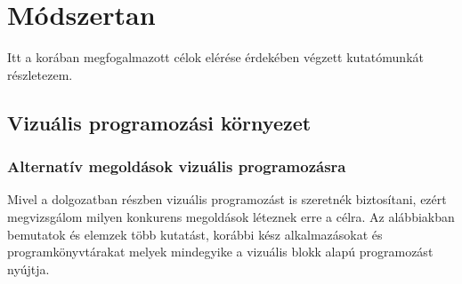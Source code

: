 \documentclass[12pt,a4paper,oneside]{report} %
\begin{document}

\chapter{Módszertan}
\label{modtan}
Itt a korában megfogalmazott célok elérése érdekében végzett kutatómunkát részletezem.
\section{Vizuális programozási környezet}
\subsection{Alternatív megoldások vizuális programozásra}
\label{vizuprogkor}
Mivel a dolgozatban részben vizuális  programozást  is szeretnék biztosítani, ezért megvizsgálom milyen konkurens megoldások léteznek erre a célra. Az alábbiakban bemutatok és elemzek több kutatást, korábbi kész alkalmazásokat és programkönyvtárakat melyek mindegyike a vizuális blokk alapú programozást nyújtja.
\end{document}
